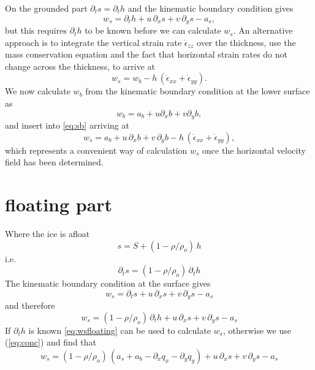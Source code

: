 \documentclass[10pt,a4paper]{book}
\newcommand{\p}{\partial}
\newcommand{\exx}{\dot{\epsilon}_{xx}}
\newcommand{\eyy}{\dot{\epsilon}_{yy}}
\newcommand{\ezz}{\dot{\epsilon}_{zz}}
\begin{document}
On the grounded part $\p_t s =\p_t h$ and the kinematic boundary condition gives
\begin{equation}
w_s=\p_t h  + u \, \p_x s + v \, \p_y s -a_s ,
\label{eq:wsg}
\end{equation}
but this requires $\p_t h$ to be known before we can calculate $w_s$. An alternative approach is to 
integrate the vertical strain rate $\ezz$ over the thickness, use the mass conservation equation and
the fact that horizontal strain rates do not change across the thickness, to arrive at
\begin{equation} 
w_s= w_b-h \, ( \exx + \eyy) .
\label{eq:sb} \end{equation}
We now calculate $w_b$ from the kinematic boundary condition at the lower surface as
\[
w_b=a_b + u \p_x b + v \p_y b ,
\]
and insert into \eqref{eq:sb} arriving at
\begin{equation} 
w_s= a_b + u \, \p_x b + v \, \p_y b -h \, ( \exx + \eyy) ,
\label{eq:wsgrounded} 
\end{equation}
which represents a convenient way of calculation $w_s$ once the horizontal velocity field has been determined.



\section{floating part}
Where the ice is afloat 
\[
s = S+(1-\rho/\rho_o) \, h 
\]
i.e.\
\[
\p_t s =  (1-\rho/\rho_o) \, \p_t h 
\]
The kinematic boundary condition at the surface gives
\[
w_s=\p_t s + u \, \p_x s + v \, \p_y s -a_s 
\]
and therefore
\begin{equation}
w_s=(1-\rho/\rho_o) \, \p_t h  + u \, \p_x s + v \, \p_y s -a_s 
\label{eq:wsfloating}
\end{equation}
If $\p_t h$ is known \eqref{eq:wsfloating} can be used to calculate $w_s$, otherwise
we use (\ref{eq:conc}) and find that
\begin{equation}
w_s=(1-\rho/\rho_o) \, (a_s+a_b - \p_x q_x - \p_y q_y)  + u \, \p_x s + v \, \p_y s -a_s 
\label{eq:wsfloating2}
\end{equation}
\end{document}

